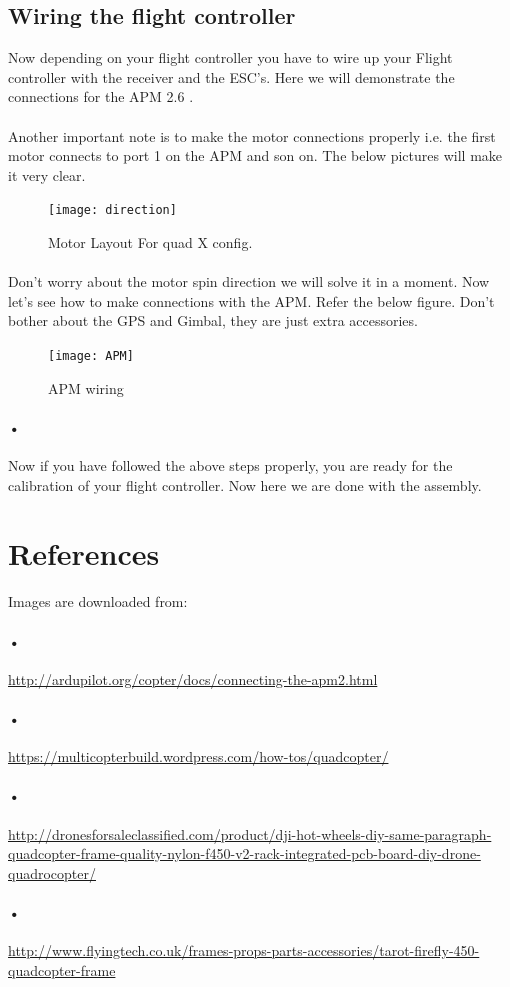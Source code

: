 \documentclass[11pt,a4paper]{article}
\begin{document}
		\subsection{Wiring the flight controller}
		Now depending on your flight controller you have to wire up your Flight controller with the receiver and the ESC's. Here we will demonstrate the connections for the APM 2.6 .
		\paragraph{} Another important note is to make the motor connections properly i.e. the first motor connects to port 1 on the APM and son on. The below pictures will make it very clear.
		\begin{figure}[h]
	 	\centering
		\texttt{[image: direction]}
		\caption{Motor Layout For quad X config.}
		\end{figure}
		\paragraph{}Don't worry about the motor spin direction we will solve it in a moment. Now let's see how to make connections with the APM. Refer the below figure. Don't bother about the GPS and Gimbal, they are just extra accessories.
		\begin{figure}[H]
    \begin{center}
    \texttt{[image: APM]}
    \caption{APM wiring}
    \label{fig: figure}
    \end{center}
\end{figure}
	\paragraph{•}
	Now if you have followed the above steps properly, you are ready for the calibration of your flight controller. Now here we are done with the assembly.
	\section{References}
	Images are downloaded from:
	\paragraph{•}
	\url{http://ardupilot.org/copter/docs/connecting-the-apm2.html}
	\paragraph{•}\url{https://multicopterbuild.wordpress.com/how-tos/quadcopter/}
	\paragraph{•}\url{http://dronesforsaleclassified.com/product/dji-hot-wheels-diy-same-paragraph-quadcopter-frame-quality-nylon-f450-v2-rack-integrated-pcb-board-diy-drone-quadrocopter/}
	\paragraph{•}\url{http://www.flyingtech.co.uk/frames-props-parts-accessories/tarot-firefly-450-quadcopter-frame}
	
\end{document}
